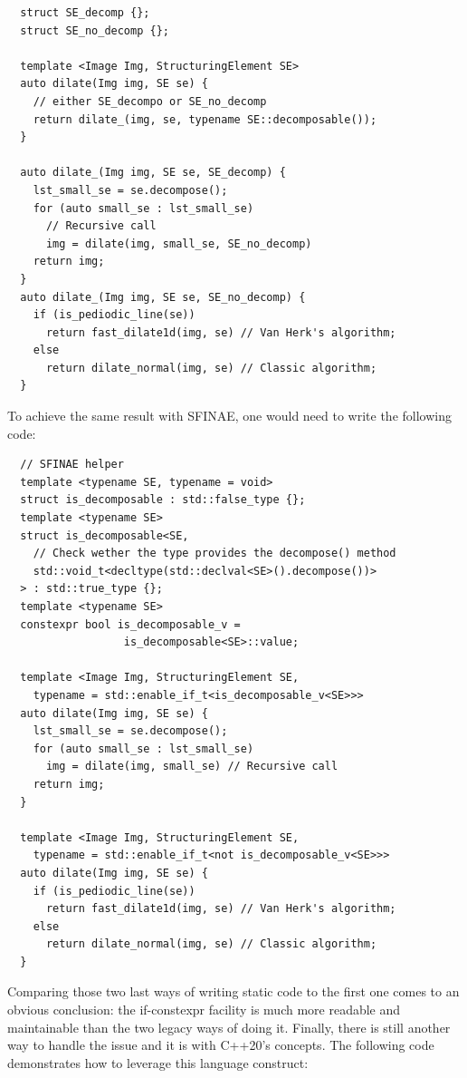 \begin{verbatim}
  struct SE_decomp {};
  struct SE_no_decomp {};

  template <Image Img, StructuringElement SE>
  auto dilate(Img img, SE se) {
    // either SE_decompo or SE_no_decomp
    return dilate_(img, se, typename SE::decomposable());
  }

  auto dilate_(Img img, SE se, SE_decomp) {
    lst_small_se = se.decompose();
    for (auto small_se : lst_small_se)
      // Recursive call
      img = dilate(img, small_se, SE_no_decomp)
    return img;
  }
  auto dilate_(Img img, SE se, SE_no_decomp) {
    if (is_pediodic_line(se))
      return fast_dilate1d(img, se) // Van Herk's algorithm;
    else
      return dilate_normal(img, se) // Classic algorithm;
  }
\end{verbatim}

To achieve the same result with SFINAE, one would need to write the following code:

\begin{verbatim}
  // SFINAE helper
  template <typename SE, typename = void>
  struct is_decomposable : std::false_type {};
  template <typename SE>
  struct is_decomposable<SE,
    // Check wether the type provides the decompose() method
    std::void_t<decltype(std::declval<SE>().decompose())>
  > : std::true_type {};
  template <typename SE>
  constexpr bool is_decomposable_v =
                  is_decomposable<SE>::value;

  template <Image Img, StructuringElement SE,
    typename = std::enable_if_t<is_decomposable_v<SE>>>
  auto dilate(Img img, SE se) {
    lst_small_se = se.decompose();
    for (auto small_se : lst_small_se)
      img = dilate(img, small_se) // Recursive call
    return img;
  }

  template <Image Img, StructuringElement SE,
    typename = std::enable_if_t<not is_decomposable_v<SE>>>
  auto dilate(Img img, SE se) {
    if (is_pediodic_line(se))
      return fast_dilate1d(img, se) // Van Herk's algorithm;
    else
      return dilate_normal(img, se) // Classic algorithm;
  }
\end{verbatim}

Comparing those two last ways of writing static code to the first one comes to an obvious conclusion: the if-constexpr
facility is much more readable and maintainable than the two legacy ways of doing it. Finally, there is still another way
to handle the issue and it is with C++20's concepts. The following code demonstrates how to leverage this language
construct:

